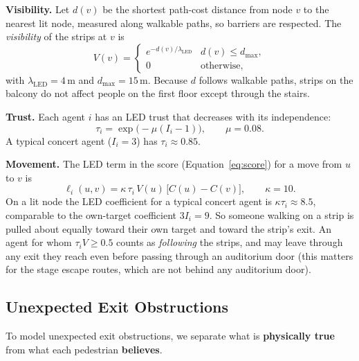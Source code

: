 \documentclass{article}
\begin{document}
\textbf{Visibility.} Let $d(v)$ be the shortest path-cost distance from node $v$ to the nearest lit node, measured along walkable paths, so barriers are respected. The \emph{visibility} of the strips at $v$ is
\begin{equation}
  V(v) =
  \begin{cases}
    e^{-d(v)/\lambda_{\mathrm{LED}}} & d(v) \le d_{\max},\\
    0 & \text{otherwise,}
  \end{cases}
\end{equation}
with $\lambda_{\mathrm{LED}} = 4\,\mathrm{m}$ and $d_{\max} = 15\,\mathrm{m}$. Because $d$ follows walkable paths, strips on the balcony do not affect people on the first floor except through the stairs.

\textbf{Trust.}
Each agent $i$ has an LED trust that decreases with its independence:
\begin{equation}
  \tau_i = \exp\!\big(-\mu(I_i - 1)\big), \qquad \mu = 0.08 .
\end{equation}
A typical concert agent ($I_i = 3$) has $\tau_i \approx 0.85$.

\textbf{Movement.} The LED term in the score (Equation~\ref{eq:score}) for a move from $u$ to $v$ is
\begin{equation}
  \ell_i(u,v) = \kappa\, \tau_i\, V(u)\,\big[C(u) - C(v)\big], \qquad \kappa = 10 .
\end{equation}
On a lit node the LED coefficient for a typical concert agent is $\kappa\tau_i \approx 8.5$, comparable to the own-target coefficient $3I_i = 9$. So someone walking on a strip is pulled about equally toward their own target and toward the strip's exit. An agent for whom $\tau_i V \ge 0.5$ counts as \emph{following} the strips, and may leave through any exit they reach even before passing through an auditorium door (this matters for the stage escape routes, which are not behind any auditorium door).

\subsection{Unexpected Exit Obstructions}
\label{sec:obstructions}

To model unexpected exit obstructions, we separate what is \textbf{physically true} from what each
pedestrian \textbf{believes}.
\end{document}
